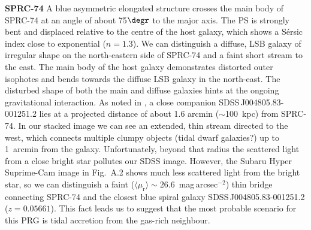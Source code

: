 \documentclass{raa}
\begin{document}
{\bf SPRC-74}
A blue asymmetric elongated structure crosses the main body of SPRC-74 at an angle of about 75$\degr$ to the major axis. The PS is strongly bent and displaced relative to the centre of the host galaxy, which shows a S\'ersic index close to exponential ($n=1.3$). We can distinguish a diffuse, LSB galaxy of irregular shape on the north-eastern side of SPRC-74 and a faint short stream to the east. The main body of the host galaxy demonstrates distorted outer isophotes and bends towards the diffuse LSB galaxy in the north-east. The disturbed shape of both the main and diffuse galaxies hints at the ongoing gravitational interaction. As noted in \citet{fink2012}, a close companion SDSS\,J004805.83-001251.2 lies at a projected distance of about 1.6 arcmin ($\sim$100~kpc) from SPRC-74. In our stacked image we can see an extended, thin stream directed to the west, which connects multiple clumpy objects (tidal dwarf galaxies?) up to 1~arcmin from the galaxy. Unfortunately, beyond that radius the scattered light from a close bright star pollutes our SDSS image. However, the Subaru Hyper Suprime-Cam image in Fig.~A.2 shows much less scattered light from the bright star, so we can distinguish a faint ($\langle \mu_\mathrm{r} \rangle\sim26.6$~mag\,arcsec$^{-2}$) thin bridge connecting SPRC-74 and the closest blue spiral galaxy SDSS\,J004805.83-001251.2 ($z=0.05661$). This fact leads us to suggest that the most probable scenario for this PRG is tidal accretion from the gas-rich neighbour.
\end{document}
